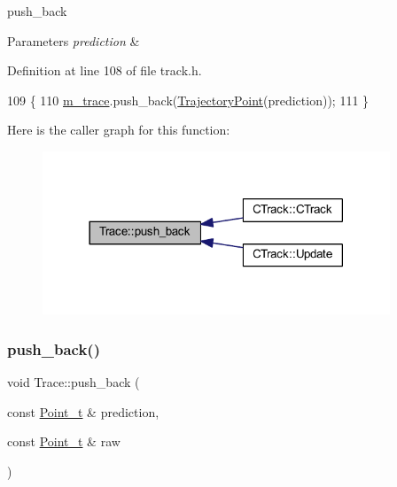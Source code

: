 push\+\_\+back 


\begin{DoxyParams}{Parameters}
{\em prediction} & \\
\hline
\end{DoxyParams}


Definition at line 108 of file track.\+h.


\begin{DoxyCode}
109     \{
110         \mbox{\hyperlink{class_trace_a2650850103966a19b5cbac6db8df8b66}{m\_trace}}.push\_back(\mbox{\hyperlink{struct_trajectory_point}{TrajectoryPoint}}(prediction));
111     \}
\end{DoxyCode}
Here is the caller graph for this function\+:\nopagebreak
\begin{figure}[H]
\begin{center}
\leavevmode
\includegraphics[width=294pt]{class_trace_a5bca62bb3439cd12991f848a875d4085_icgraph}
\end{center}
\end{figure}
\mbox{\label{class_trace_ae7696e9f00fd53dbef9a122d913f4965}} 
\subsubsection{\texorpdfstring{push\+\_\+back()}{push\_back()}\hspace{0.1cm}{\footnotesize\ttfamily [2/2]}}
{\footnotesize\ttfamily void Trace\+::push\+\_\+back (\begin{DoxyParamCaption}\item[{const \mbox{\hyperlink{defines_8h_a8c42696da8f098b91374a8e8bb84b430}{Point\+\_\+t}} \&}]{prediction,  }\item[{const \mbox{\hyperlink{defines_8h_a8c42696da8f098b91374a8e8bb84b430}{Point\+\_\+t}} \&}]{raw }\end{DoxyParamCaption})\hspace{0.3cm}{\ttfamily [inline]}}



